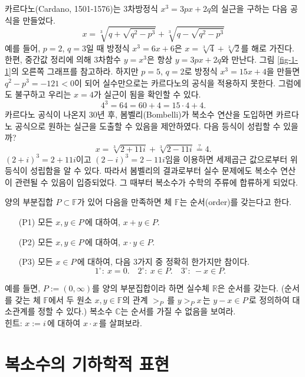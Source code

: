 카르다노(Cardano, 1501-1576)는 
3차방정식 $x^3=3px+2q$의 실근을 구하는 다음 공식을 만들었다.
$$
x = \sqrt[3]{q+ \sqrt{q^2-p^3}} + \sqrt[3]{q- \sqrt{q^2-p^3}}
$$
예를 들어, $p=2$, $q=3$일 때 방정식 $x^3=6x+6$은 $x=\sqrt[3]{4}+\sqrt[3]{2}$를 해로 가진다.
한편, 중간값 정리에 의해 3차함수 $y=x^3$은  항상 $y=3px+2q$와 만난다.
그림 \ref{fig-1-1}의 오른쪽 그래프를 참고하라.
하지만 $p=5$, $q=2$로 방정식 $x^3=15 x+4$을 만들면 $q^2-p^3= -121<0$이 되어
실수만으로는 카르다노의 공식을 적용하지 못한다.
그럼에도 불구하고 우리는 $x=4$가 실근이 됨을 확인할 수 있다.
$$
4^3 = 64 = 60 + 4 = 15\cdot 4 + 4.
$$
카르다노 공식이 나온지 30년 후, 봄벨리(Bombelli)가 복소수 연산을 도입하면
카르다노 공식으로 원하는 실근을 도출할 수 있음을 제안하였다.
다음 등식이 성립할 수 있을까?
$$
x = \sqrt[3]{2+11i} + \sqrt[3]{2-11i} \stackrel{?}{=} 4.
$$
$(2+i)^3 = 2+11i$이고 $(2-i)^3 = 2-11i$임을 이용하면
세제곱근 값으로부터 위 등식이 성립함을 알 수 있다.
따라서 봄벨리의 결과로부터 실수 문제에도 복소수 연산이 관련될 수 있음이 입증되었다.
그 때부터 복소수가 수학의 주류에 합류하게 되었다.

\begin{salt_exercise} \label{ex-1-3}
양의 부분집합 $P\subset \mathbb F$가 있어 다음을 만족하면
체 $\mathbb F$는 순서(order)를 갖는다고 한다.
\begin{itemize}[topsep=-0.5\parskip, leftmargin=50pt]
\item[(P1)] 모든 $x,y\in P\,$에 대하여, $x+y\in P$.
\item[(P2)] 모든 $x,y\in P\,$에 대하여, $x\cdot y \in P$.
\item[(P3)] 모든 $x\in P\,$에 대하여, 다음 3가지 중  정확히 한가지만 참이다.
$$
1^{\circ} : \ x=0. \quad 2^{\circ} : \ x\in P. \quad 3^{\circ} : \ -x\in P.
$$
\end{itemize}
예를 들면, $P:=(0,\infty)$를 양의 부분집합이라 하면
실수체 $\mathbb R$은 순서를 갖는다.
(순서를 갖는 체 $\mathbb F$에서 두 원소 $x,y\in \mathbb F$의 관계 $>_P\,$를
$y>_P x\,$는 $y-x \in P\,$로 정의하여 대소관계를 정할 수 있다.)
복소수 $\mathbb C$는 순서를 가질 수 없음을 보여라. \\[1ex]
힌트: $x:=i\,$에 대하여 $x\cdot x\,$를 살펴보라.
\end{salt_exercise}

\section{복소수의 기하학적 표현}

